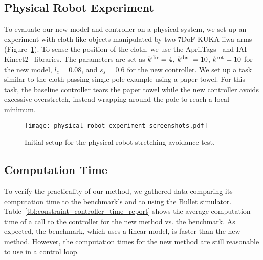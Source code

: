 \FloatBarrier

\subsection{Physical Robot Experiment}

To evaluate our new model and controller on a physical system, we set up an experiment with cloth-like objects manipulated by two 7DoF KUKA iiwa arms (Figure~\ref{fig:physical_experiment_screenshot_ctl}). To sense the position of the cloth, we use the AprilTags~\cite{olson2011tags} and IAI Kinect2~\cite{iai_kinect2} libraries. The parameters are set as $k^\textrm{dir} = 4$, $k^\textrm{dist} = 10$, $k^{\textrm{rot}} = 10$ for the new model, $l_c = 0.08$, and $s_s = 0.6$ for the new controller. We set up a task similar to the cloth-passing-single-pole example using a paper towel. For this task, the baseline controller tears the paper towel while the new controller avoids excessive overstretch, instead wrapping around the pole to reach a local minimum.

\begin{figure}[h]
    \centering
    \texttt{[image: physical\_robot\_experiment\_screenshots.pdf]}
    \caption{Initial setup for the physical robot stretching avoidance test.}
    \label{fig:physical_experiment_screenshot_ctl}
\end{figure}

\FloatBarrier

\subsection{Computation Time}

To verify the practicality of our method, we gathered data comparing its computation time to the benchmark's and to using the Bullet simulator. Table~\ref{tbl:constraint_controller_time_report} shows the average computation time of a call to the controller for the new method vs. the benchmark. As expected, the benchmark, which uses a linear model, is faster than the new method. However, the computation times for the new method are still reasonable to use in a control loop.

